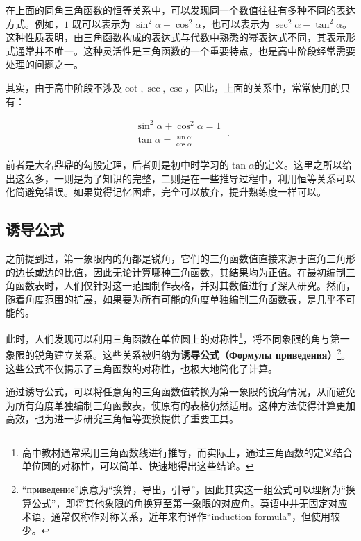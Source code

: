 在上面的同角三角函数的恒等关系中，可以发现同一个数值往往有多种不同的表达方式。例如，$1$ 既可以表示为 $\sin^2\alpha+\cos^2\alpha$，也可以表示为 $\sec^2\alpha-\tan^2\alpha$。这种性质表明，由三角函数构成的表达式与代数中熟悉的幂表达式不同，其表示形式通常并不唯一。这种灵活性是三角函数的一个重要特点，也是高中阶段经常需要处理的问题之一。

其实，由于高中阶段不涉及$\cot,\sec,\csc$，因此，上面的关系中，常常使用的只有：

\begin{equation}
\begin{array}{c} 
\sin ^{2} \alpha + \cos ^{2}\alpha=1\\
\displaystyle\tan \alpha= \frac{\sin \alpha}{\cos \alpha}
\end{array}~.
\end{equation}

前者是大名鼎鼎的勾股定理，后者则是初中时学习的$\tan\alpha$的定义。这里之所以给出这么多，一则是为了知识的完整，二则是在一些推导过程中，利用恒等关系可以化简避免错误。如果觉得记忆困难，完全可以放弃，提升熟练度一样可以。

\subsection{诱导公式}

之前提到过，第一象限内的角都是锐角，它们的三角函数值直接来源于直角三角形的边长或边的比值，因此无论计算哪种三角函数，其结果均为正值。在最初编制三角函数表时，人们仅针对这一范围制作表格，并对其数值进行了深入研究。然而，随着角度范围的扩展，如果要为所有可能的角度单独编制三角函数表，是几乎不可能的。

此时，人们发现可以利用三角函数在单位圆上的对称性\footnote{高中教材通常采用三角函数线进行推导，而实际上，通过三角函数的定义结合单位圆的对称性，可以简单、快速地得出这些结论。}，将不同象限的角与第一象限的锐角建立关系。这些关系被归纳为\textbf{诱导公式（Формулы приведения）}\footnote{“приведение”原意为“换算，导出，引导”，因此其实这一组公式可以理解为“换算公式”，即将其他象限的角换算至第一象限的对应角。英语中并无固定对应术语，通常仅称作对称关系，近年来有译作“induction formula”，但使用较少。}。这些公式不仅揭示了三角函数的对称性，也极大地简化了计算。

通过诱导公式，可以将任意角的三角函数值转换为第一象限的锐角情况，从而避免为所有角度单独编制三角函数表，使原有的表格仍然适用。这种方法使得计算更加高效，也为进一步研究三角恒等变换提供了重要工具。

